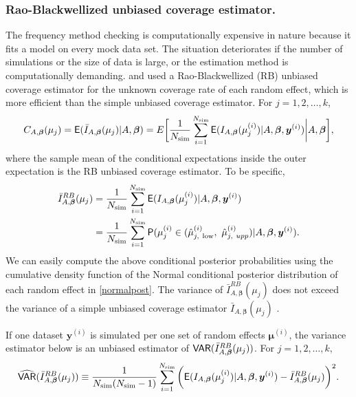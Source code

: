 \documentclass[article]{jss}
\begin{document}
\subsubsection{Rao-Blackwellized unbiased coverage estimator.}
The frequency method checking is computationally expensive in nature because it  fits a model on every mock data set. The situation deteriorates if the number of simulations or the size of data is large, or the estimation method is computationally demanding. \citet{morris1997} and \cite{tang2002fitting} used a Rao-Blackwellized (RB) unbiased coverage estimator for the unknown coverage rate of each random effect, which is more efficient than the simple unbiased coverage estimator.  For $j=1, 2, \ldots, k$,
\begin{equation}\label{RB_theory}
C_{A, \boldsymbol{\beta}}(\mu_j)=\mathsf{E}(\bar{I}_{A, \boldsymbol{\beta}}(\mu_j)\vert A, \boldsymbol{\beta})=E\bigg[\frac{1}{N_{\textrm{sim}}}\sum_{i=1}^{N_{\textrm{sim}}}\mathsf{E}(I_{A, \boldsymbol{\beta}}(\mu_j^{(i)})\vert A, \boldsymbol{\beta}, \boldsymbol{y}^{(i)})\bigg\vert A, \boldsymbol{\beta}\bigg],
\end{equation}
where the sample mean of the conditional expectations inside the outer expectation is the RB unbiased coverage estimator. To be specific,
\begin{align}\label{RB}
\bar{I}^{RB}_{A, \boldsymbol{\beta}}(\mu_j) &= \frac{1}{N_{\textrm{sim}}}\sum_{i=1}^{N_{\textrm{sim}}}\mathsf{E}(I_{A, \boldsymbol{\beta}}(\mu_j^{(i)})\vert A, \boldsymbol{\beta}, \boldsymbol{y}^{(i)})\\
&= \frac{1}{N_{\textrm{sim}}}\sum_{i=1}^{N_{\textrm{sim}}} \mathsf{P}(\mu_j^{(i)}\in(\hat{\mu}^{(i)}_{j, ~\textrm{low}}, ~\hat{\mu}^{(i)}_{j, ~upp})\vert A, \boldsymbol{\beta},  \boldsymbol{y}^{(i)}).
\end{align}
We  can easily compute the above conditional posterior probabilities using the cumulative density function of the Normal conditional posterior distribution of each random effect in  \eqref{normalpost}. The variance of  $\bar{I}^{RB}_{A, \boldsymbol{\beta}}(\mu_j)$ does not exceed the variance of a simple unbiased coverage estimator $\bar{I}_{A, \boldsymbol{\beta}}(\mu_j)$ \citep{radhakrishna1945information, blackwell1947conditional}.






If one dataset $\boldsymbol{y}^{(i)}$ is simulated per one set of random effects $\boldsymbol{\mu}^{(i)}$, the variance estimator below is an unbiased estimator of $\mathsf{VAR}(\bar{I}^{RB}_{A, \boldsymbol{\beta}}(\mu_j) )$. For $j=1, 2, \ldots, k,$
\begin{equation}\label{RBvar}
\widehat{\mathsf{VAR}}(\bar{I}^{RB}_{A, \boldsymbol{\beta}}(\mu_j) )\equiv\frac{1}{N_{\textrm{sim}}(N_{\textrm{sim}}-1)}\sum_{i=1}^{N_{\textrm{sim}}}\bigg(\mathsf{E}(I_{A, \boldsymbol{\beta}}(\mu_j^{(i)})\vert A, \boldsymbol{\beta}, \boldsymbol{y}^{(i)})-\bar{I}^{RB}_{A, \boldsymbol{\beta}}(\mu_j) \bigg)^{2}.
\end{equation}
\end{document}
